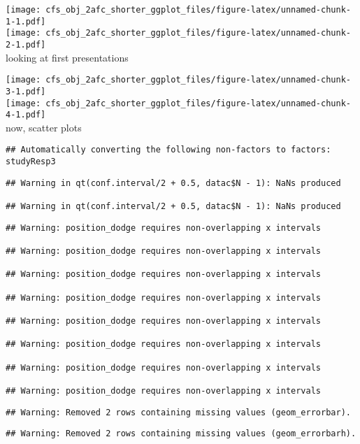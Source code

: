 \documentclass[]{article}
\begin{document}
\texttt{[image: cfs\_obj\_2afc\_shorter\_ggplot\_files/figure-latex/unnamed-chunk-1-1.pdf]}\\
\texttt{[image: cfs\_obj\_2afc\_shorter\_ggplot\_files/figure-latex/unnamed-chunk-2-1.pdf]}\\

looking at first presentations

\texttt{[image: cfs\_obj\_2afc\_shorter\_ggplot\_files/figure-latex/unnamed-chunk-3-1.pdf]}\\
\texttt{[image: cfs\_obj\_2afc\_shorter\_ggplot\_files/figure-latex/unnamed-chunk-4-1.pdf]}\\

now, scatter plots

\begin{verbatim}
## Automatically converting the following non-factors to factors: studyResp3
\end{verbatim}

\begin{verbatim}
## Warning in qt(conf.interval/2 + 0.5, datac$N - 1): NaNs produced

## Warning in qt(conf.interval/2 + 0.5, datac$N - 1): NaNs produced
\end{verbatim}

\begin{verbatim}
## Warning: position_dodge requires non-overlapping x intervals

## Warning: position_dodge requires non-overlapping x intervals

## Warning: position_dodge requires non-overlapping x intervals

## Warning: position_dodge requires non-overlapping x intervals

## Warning: position_dodge requires non-overlapping x intervals

## Warning: position_dodge requires non-overlapping x intervals

## Warning: position_dodge requires non-overlapping x intervals

## Warning: position_dodge requires non-overlapping x intervals
\end{verbatim}

\begin{verbatim}
## Warning: Removed 2 rows containing missing values (geom_errorbar).
\end{verbatim}

\begin{verbatim}
## Warning: Removed 2 rows containing missing values (geom_errorbarh).
\end{verbatim}
\end{document}
